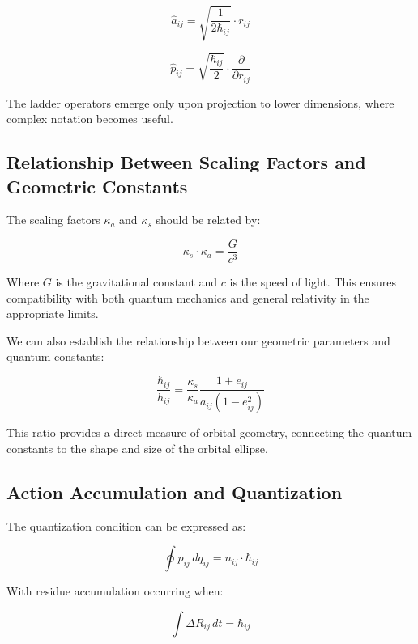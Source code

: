 \documentclass{article}
\begin{document}
\begin{equation}
\hat{a}_{ij} = \sqrt{\frac{1}{2\hbar_{ij}}} \cdot r_{ij}
\end{equation}

\begin{equation}
\hat{p}_{ij} = \sqrt{\frac{\hbar_{ij}}{2}} \cdot \frac{\partial}{\partial r_{ij}}
\end{equation}

The ladder operators emerge only upon projection to lower dimensions, where complex notation becomes useful.

\subsection{Relationship Between Scaling Factors and Geometric Constants}

The scaling factors $\kappa_a$ and $\kappa_s$ should be related by:

\begin{equation}
\kappa_s \cdot \kappa_a = \frac{G}{c^3}
\end{equation}

Where $G$ is the gravitational constant and $c$ is the speed of light. This ensures compatibility with both quantum mechanics and general relativity in the appropriate limits.

We can also establish the relationship between our geometric parameters and quantum constants:

\begin{equation}
\frac{\hbar_{ij}}{h_{ij}} = \frac{\kappa_s}{\kappa_a} \frac{1+e_{ij}}{a_{ij}(1-e_{ij}^2)}
\end{equation}

This ratio provides a direct measure of orbital geometry, connecting the quantum constants to the shape and size of the orbital ellipse.

\subsection{Action Accumulation and Quantization}

The quantization condition can be expressed as:

\begin{equation}
\oint p_{ij} \, dq_{ij} = n_{ij} \cdot \hbar_{ij}
\end{equation}

With residue accumulation occurring when:

\begin{equation}
\int \Delta R_{ij} \, dt = \hbar_{ij}
\end{equation}
\end{document}
